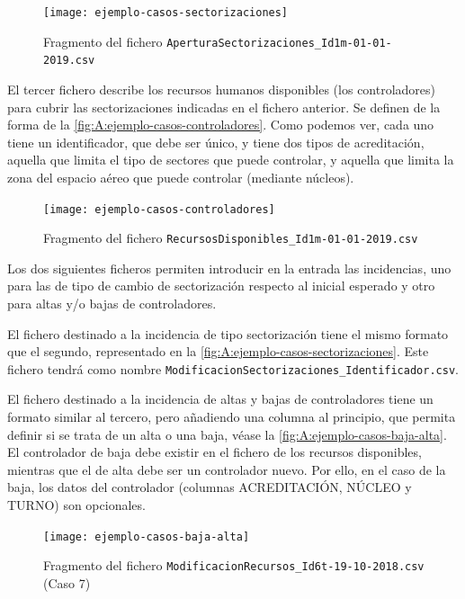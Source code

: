 \begin{figure}[h]
	\centering
	\texttt{[image: ejemplo-casos-sectorizaciones]}
	\caption{Fragmento del fichero \texttt{AperturaSectorizaciones\_Id1m-01-01-2019.csv}}
	\label{fig:A:ejemplo-casos-sectorizaciones}
\end{figure}

El tercer fichero describe los recursos humanos disponibles (los controladores) para cubrir las sectorizaciones indicadas en el fichero anterior. Se definen de la forma de la \autoref{fig:A:ejemplo-casos-controladores}. Como podemos ver, cada uno tiene un identificador, que debe ser único, y tiene dos tipos de acreditación, aquella que limita el tipo de sectores que puede controlar, y aquella que limita la zona del espacio aéreo que puede controlar (mediante núcleos).

\begin{figure}[h]
	\centering
	\texttt{[image: ejemplo-casos-controladores]}
	\caption{Fragmento del fichero \texttt{RecursosDisponibles\_Id1m-01-01-2019.csv}}
	\label{fig:A:ejemplo-casos-controladores}
\end{figure}

Los dos siguientes ficheros permiten introducir en la entrada las incidencias, uno para las de tipo de cambio de sectorización respecto al inicial esperado y otro para altas y/o bajas de controladores.

El fichero destinado a la incidencia de tipo sectorización tiene el mismo formato que el segundo, representado en la \autoref{fig:A:ejemplo-casos-sectorizaciones}. Este fichero tendrá como nombre \texttt{ModificacionSectorizaciones\_Identificador.csv}.

El fichero destinado a la incidencia de altas y bajas de controladores tiene un formato similar al tercero, pero añadiendo una columna al principio, que permita definir si se trata de un alta o una baja, véase la \autoref{fig:A:ejemplo-casos-baja-alta}. El controlador de baja debe existir en el fichero de los recursos disponibles, mientras que el de alta debe ser un controlador nuevo. Por ello, en el caso de la baja, los datos del controlador (columnas ACREDITACIÓN, NÚCLEO y TURNO) son opcionales.

\begin{figure}[h]
	\centering
	\texttt{[image: ejemplo-casos-baja-alta]}
	\caption{Fragmento del fichero \texttt{ModificacionRecursos\_Id6t-19-10-2018.csv} (Caso 7)}
	\label{fig:A:ejemplo-casos-baja-alta}
\end{figure}

